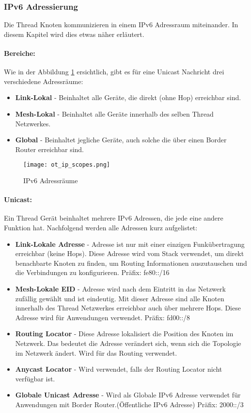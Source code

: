 \subsubsection{IPv6 Adressierung}\label{subsubsec:IPv6Adressierung}
Die Thread Knoten kommunizieren in einem IPv6 Adressraum miteinander. In diesem Kapitel wird dies etwas näher erläutert. \cite[Kapitel 5]{thread_group_inc_thread_2017}
\paragraph{Bereiche:}
Wie in der Abbildung \ref{fig:IPv6Adressräume} ersichtlich, gibt es für eine Unicast Nachricht drei verschiedene Adressräume:

\begin{itemize}
	\item \textbf{Link-Lokal} - Beinhaltet alle Geräte, die direkt (ohne Hop) erreichbar sind.
	\item \textbf{Mesh-Lokal} - Beinhaltet alle Geräte innerhalb des selben Thread Netzwerkes.
	\item \textbf{Global} - Beinhaltet jegliche Geräte, auch solche die über einen Border Router erreichbar sind.
\end{itemize}

\begin{figure}[H]
	\centering
	\texttt{[image: ot\_ip\_scopes.png]}
	\caption{IPv6 Adressräume \cite{openthread_ot-primer-scopes_2xpng_2016}}\label{fig:IPv6Adressräume}
\end{figure}

\paragraph{Unicast:}
Ein Thread Gerät beinhaltet mehrere IPv6 Adressen, die jede eine andere Funktion hat. Nachfolgend werden alle Adressen kurz aufgelistet: 

\begin{itemize}
	\item \textbf{Link-Lokale Adresse} - Adresse ist nur mit einer einzigen Funkübertragung erreichbar (keine Hops). Diese Adresse wird vom Stack verwendet, um direkt benachbarte Knoten zu finden, um Routing Informationen auszutauschen und die Verbindungen zu konfigurieren. Präfix: fe80::/16
	\item \textbf{Mesh-Lokale EID} - Adresse wird nach dem Eintritt in das Netzwerk zufällig gewählt und ist eindeutig. Mit dieser Adresse sind alle Knoten innerhalb des Thread Netzwerkes erreichbar auch über mehrere Hops. Diese Adresse wird für Anwendungen verwendet. Präfix: fd00::/8
	\item \textbf{Routing Locator} - Diese Adresse lokalisiert die Position des Knoten im Netzwerk. Das bedeutet die Adresse verändert sich, wenn sich die Topologie im Netzwerk ändert. Wird für das Routing verwendet.
	\item \textbf{Anycast Locator} - Wird verwendet, falls der Routing Locator nicht verfügbar ist.
	\item \textbf{Globale Unicast Adresse} - Wird als Globale IPv6 Adresse verwendet für Anwendungen mit Border Router.(Öffentliche IPv6 Adresse) Präfix: 2000::/3
\end{itemize}

